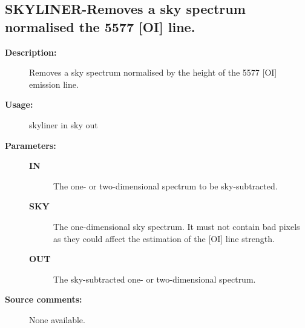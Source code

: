 \subsection{SKYLINER-\label{SKYLINER}Removes a sky spectrum normalised the 5577 [OI] line.}
\begin{description}

\item [\textbf{Description:}]
 Removes a sky spectrum normalised by the height of the 5577 [OI]
 emission line.

\item [\textbf{Usage:}]
 skyliner in sky out

\item [\textbf{Parameters:}]
\begin{description}
\item [\textbf{IN}]
 The one- or two-dimensional spectrum to be sky-subtracted.
\item [\textbf{SKY}]
 The one-dimensional sky spectrum.  It must not contain bad
 pixels as they could affect the estimation of the [OI] line
 strength.
\item [\textbf{OUT}]
 The sky-subtracted one- or two-dimensional spectrum.

\end{description}

\item [\textbf{Source comments:}]
\begin{terminalv}
 None available.

\end{terminalv}
\end{description}
